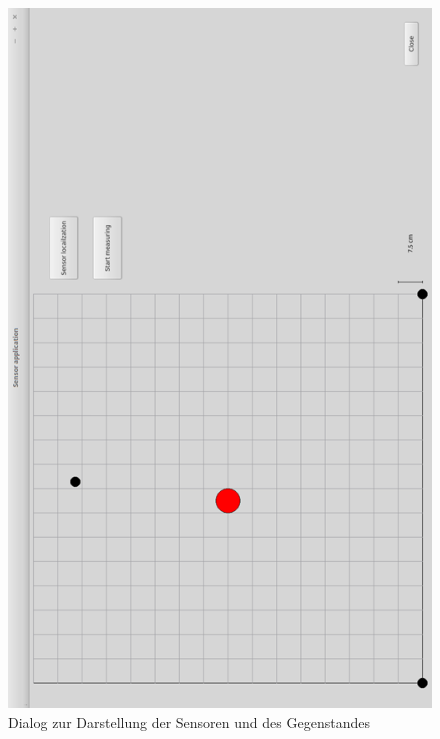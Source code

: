 \begin{landscape}
	\begin{figure}
		\centering
		\includegraphics[width=(0.9\textwidth), angle=270]{images/gui/03.png}
		\caption{Dialog zur Darstellung der Sensoren und des Gegenstandes} \label{img:gui3}
	\end{figure}
\end{landscape}
